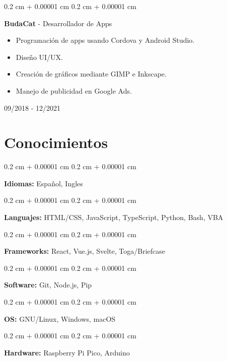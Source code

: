 \documentclass[12pt, letterpaper]{article}
\newenvironment{highlights}{
    \begin{itemize}[
        topsep=0.10 cm,
        parsep=0.10 cm,
        partopsep=0pt,
        itemsep=0pt,
        leftmargin=0.4 cm + 10pt
    ]
}{
    \end{itemize}
} %
\newenvironment{onecolentry}{
    \begin{adjustwidth}{
        0.2 cm + 0.00001 cm
    }{
        0.2 cm + 0.00001 cm
    }
}{
    \end{adjustwidth}
} %
\newenvironment{twocolentry}[2][]{
    \onecolentry
    \def\secondColumn{#2}
    \setcolumnwidth{\fill, 4.5 cm}
    \begin{paracol}{2}
}{
    \switchcolumn \raggedleft \secondColumn
    \end{paracol}
    \endonecolentry
} %
\begin{document}
\vspace{0.3 cm}

\begin{twocolentry}{

        09/2018 - 12/2021
    }
    \textbf{BudaCat} - Desarrollador de Apps
    \begin{highlights}
        \item Programación de apps usando Cordova y Android Studio.
        \item Diseño UI/UX.
        \item Creación de gráficos mediante GIMP e Inkscape.
        \item Manejo de publicidad en Google Ads.
    \end{highlights}
\end{twocolentry}

\vspace{0.5 cm}

\section{Conocimientos}

\vspace{0.2 cm}

\begin{onecolentry}
    \textbf{Idiomas:} Español, Ingles
\end{onecolentry}

\vspace{0.2 cm}

\begin{onecolentry}
    \textbf{Languajes:} HTML/CSS, JavaScript, TypeScript, Python, Bash, VBA
\end{onecolentry}

\vspace{0.2 cm}

\begin{onecolentry}
    \textbf{Frameworks:} React, Vue.js, Svelte, Toga/Briefcase
\end{onecolentry}

\vspace{0.2 cm}

\begin{onecolentry}
    \textbf{Software:} Git, Node.js, Pip
\end{onecolentry}

\vspace{0.2 cm}

\begin{onecolentry}
    \textbf{OS:} GNU/Linux, Windows, macOS
\end{onecolentry}

\vspace{0.2 cm}

\begin{onecolentry}
    \textbf{Hardware:} Raspberry Pi Pico, Arduino
\end{onecolentry}
\end{document}
